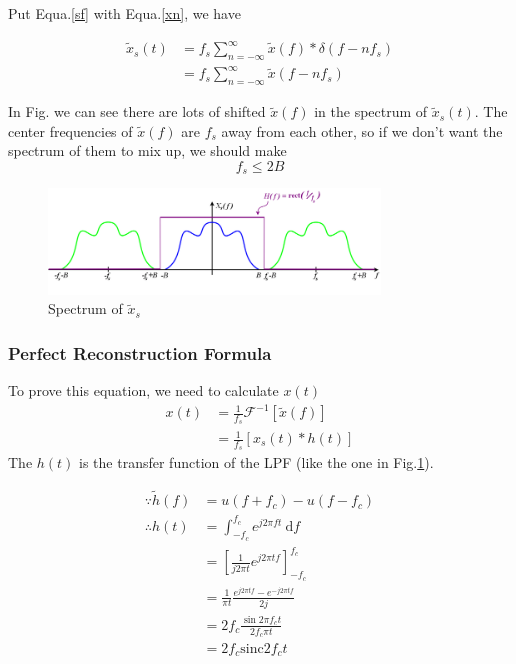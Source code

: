 \documentclass{article}
\begin{document}
Put Equa.\ref{sf} with Equa.\ref{xn}, we have

\begin{align}
    \widetilde{x}_s(t) &= f_s \sum_{n = -\infty}^{\infty} \widetilde{x}(f) * \delta(f - nf_s) \nonumber \\
    &= f_s \sum_{n = -\infty}^{\infty} \widetilde{x}(f - nf_s)
\end{align}

In Fig.  we can see there are lots of shifted $\widetilde{x}(f)$ in the spectrum of $\widetilde{x}_s(t)$. The center frequencies of $\widetilde{x}(f)$ are $f_s$ away from each other, so if we don't want the spectrum of them to mix up, we should make
$$
f_s \leq 2B
$$

\begin{figure}[htbp]
    \centering
    \includegraphics[keepaspectratio,width=250pt]{sampling.png}
    \caption{Spectrum of $\widetilde{x}_s$}\label{sampling}
\end{figure}

\subsubsection*{Perfect Reconstruction Formula}

To prove this equation, we need to calculate $x(t)$
\begin{align}
    x(t) &= \frac{1}{f_s} \mathcal{F}^{-1} \left[ \widetilde{x}(f) \right] \nonumber \\
    &= \frac{1}{f_s} \left[ x_s(t) * h(t) \right] \label{xt}
\end{align}
The $h(t)$ is the transfer function of the LPF (like the one in Fig.\ref{sampling}).

\begin{align}
    \because \widetilde{h}(f) &= u(f + f_c) - u(f - f_c)\nonumber \\
    \therefore h(t) &= \int_{-f_c}^{f_c} e^{j2 \pi ft} ~ \mathrm{d}f \nonumber\\
    &= \left[ \frac{1}{j2 \pi t} e^{j2 \pi t f} \right]_{-f_c }^{f_c}\nonumber \\
    &= \frac{1}{\pi t} \frac{e^{j2 \pi t f} - e^{- j2 \pi t f}}{2j}\nonumber \\
    &= 2f_c \frac{\sin 2\pi f_c t}{2f_c \pi t} \nonumber \\
    &= 2f_c \mathrm{sinc} 2f_c t \label{hf}
\end{align}
\end{document}
